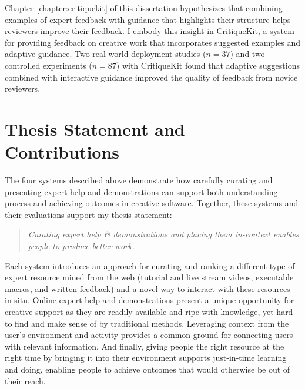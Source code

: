 Chapter \ref{chapter:critiquekit} of this dissertation hypothesizes that combining examples of expert feedback with guidance that highlights their structure helps reviewers improve their feedback. I embody this insight in CritiqueKit, a system for providing feedback on creative work that incorporates suggested examples and adaptive guidance. Two real-world deployment studies ($n=37$) and two controlled experiments ($n=87$) with CritiqueKit found that adaptive suggestions combined with interactive guidance improved the quality of feedback from novice reviewers. 

\section{Thesis Statement and Contributions}
The four systems described above demonstrate how carefully curating and presenting expert help and demonstrations can support both understanding process and achieving outcomes in creative software. Together, these systems and their evaluations support my thesis statement:

\begin{quote}
    \textit{Curating expert help \& demonstrations and placing them in-context enables people to produce better work.}
\end{quote}

Each system introduces an approach for curating and ranking a different type of expert resource mined from the web (tutorial and live stream videos, executable macros, and written feedback) and a novel way to interact with these resources in-situ. Online expert help and demonstrations present a unique opportunity for creative support as they are readily available and ripe with knowledge, yet hard to find and make sense of by traditional methods. Leveraging context from the user's environment and activity provides a common ground \cite{Clark2006} for connecting users with relevant information. And finally, giving people the right resource at the right time by bringing it into their environment supports just-in-time learning and doing, enabling people to achieve outcomes that would otherwise be out of their reach. 

